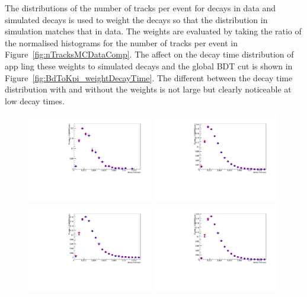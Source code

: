 The distributions of the number of tracks per event for \bdkpi decays in data and simulated decays is used to weight the \bdkpi decays so that the distribution in simulation matches that in data. The weights are evaluated by taking the ratio of the normalised histograms for the number of tracks per event in Figure~\ref{fig:nTracksMCDataComp}. The affect on the decay time distribution of app ling these weights to \bdkpi simulated decays and the global BDT cut is shown in Figure~\ref{fig:BdToKpi_weightDecayTime}. The different between the decay time distribution with and without the weights is not large but clearly noticeable at low decay times. 

\begin{figure}[ht]
  \centering
    \includegraphics[width=0.49\textwidth]{./Figs/LifetimeMeasurement/2011_B_TAU_Bd2KPi_MC_weighted_and_unweighted.pdf}
    \includegraphics[width=0.49\textwidth]{./Figs/LifetimeMeasurement/2012_B_TAU_Bd2KPi_MC_weighted_and_unweighted.pdf}
    \includegraphics[width=0.49\textwidth]{./Figs/LifetimeMeasurement/2015_B_TAU_Bd2KPi_MC_weighted_and_unweighted.pdf}
    \includegraphics[width=0.49\textwidth]{./Figs/LifetimeMeasurement/2016_B_TAU_Bd2KPi_MC_weighted_and_unweighted.pdf}

\end{figure}
